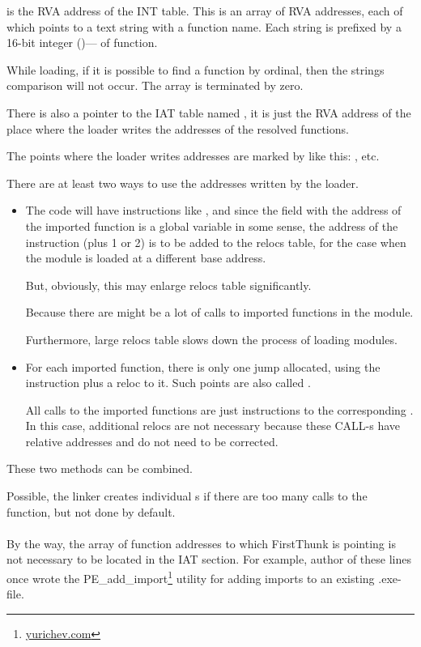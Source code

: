  is the \ac{RVA} address of the \ac{INT} table. 
This is an array of \ac{RVA} addresses, each of which points to a text string with a function name. 
Each string is prefixed by a 16-bit integer 
()--- of function.

While loading, if it is possible to find a function by ordinal,
then the strings comparison will not occur. The array is terminated by zero.

There is also a pointer to the \ac{IAT} table named , it is just the \ac{RVA} address 
of the place where the loader writes the addresses of the resolved functions.

The points where the loader writes addresses are marked by \IDA like this: , etc.

There are at least two ways to use the addresses written by the loader.

\begin{itemize}
\item The code will have instructions like , 
and since the field with the address of the imported function is a global variable in some sense, 
the address of the  instruction (plus 1 or 2) is to be added to the relocs table,
for the case when the module is loaded at a different base address.

But, obviously, this may enlarge relocs table significantly.

Because there are might be a lot of calls to imported functions in the module.

Furthermore, large relocs table slows down the process of loading modules.

\item For each imported function, there is only one jump allocated, using the \JMP instruction 
plus a reloc to it.
Such points are also called .

All calls to the imported functions are just \CALL instructions to the corresponding .
In this case, additional relocs are not necessary because these CALL-s
have relative addresses and do not need to be corrected.
\end{itemize}

These two methods can be combined.

Possible, the linker creates individual s if there are too many calls to the function,
but not done by default. \\
\\
By the way, the array of function addresses to which FirstThunk is pointing is not necessary to be located in the \ac{IAT} section.
For example, author of these lines once wrote the PE\_add\_import\footnote{\href{http://go.yurichev.com/17049}{yurichev.com}} 
utility for adding imports to an existing .exe-file.

